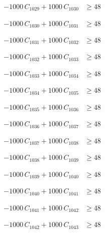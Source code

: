 \documentclass[a4paper,11pt]{article}
\begin{document}
\begin{align}
-1000\,C_{1029} + 1000\,C_{1030} &\geq 48 \nonumber
\end{align}

\begin{align}
-1000\,C_{1030} + 1000\,C_{1031} &\geq 48 \nonumber
\end{align}

\begin{align}
-1000\,C_{1031} + 1000\,C_{1032} &\geq 48 \nonumber
\end{align}

\begin{align}
-1000\,C_{1032} + 1000\,C_{1033} &\geq 48 \nonumber
\end{align}

\begin{align}
-1000\,C_{1033} + 1000\,C_{1034} &\geq 48 \nonumber
\end{align}

\begin{align}
-1000\,C_{1034} + 1000\,C_{1035} &\geq 48 \nonumber
\end{align}

\begin{align}
-1000\,C_{1035} + 1000\,C_{1036} &\geq 48 \nonumber
\end{align}

\begin{align}
-1000\,C_{1036} + 1000\,C_{1037} &\geq 48 \nonumber
\end{align}

\begin{align}
-1000\,C_{1037} + 1000\,C_{1038} &\geq 48 \nonumber
\end{align}

\begin{align}
-1000\,C_{1038} + 1000\,C_{1039} &\geq 48 \nonumber
\end{align}

\begin{align}
-1000\,C_{1039} + 1000\,C_{1040} &\geq 48 \nonumber
\end{align}

\begin{align}
-1000\,C_{1040} + 1000\,C_{1041} &\geq 48 \nonumber
\end{align}

\begin{align}
-1000\,C_{1041} + 1000\,C_{1042} &\geq 48 \nonumber
\end{align}

\begin{align}
-1000\,C_{1042} + 1000\,C_{1043} &\geq 48 \nonumber
\end{align}
\end{document}
